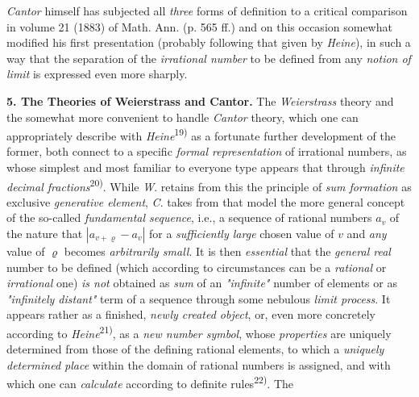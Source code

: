 \thispagestyle{fancy}

\vspace{0.5cm}

\textit{Cantor} himself has subjected all \textit{three} forms of definition to a critical comparison in volume 21 (1883) of Math. Ann. (p. 565 ff.) and on this occasion somewhat modified his first presentation (probably following that given by \textit{Heine}), in such a way that the separation of the \textit{irrational number} to be defined from any \textit{notion of limit} is expressed even more sharply.

\vspace{0.3cm}

\textbf{5. The Theories of Weierstrass and Cantor.} The \textit{Weierstrass} theory and the somewhat more convenient to handle \textit{Cantor} theory, which one can appropriately describe with \textit{Heine}\textsuperscript{19)} as a fortunate further development of the former, both connect to a specific \textit{formal representation} of irrational numbers, as whose simplest and most familiar to everyone type appears that through \textit{infinite decimal fractions}\textsuperscript{20)}. While \textit{W}. retains from this the principle of \textit{sum formation} as exclusive \textit{generative element}, \textit{C}. takes from that model the more general concept of the so-called \textit{fundamental sequence}, i.e., a sequence of rational numbers $a_v$ of the nature that $|a_{v+\varrho}-a_v|$ for a \textit{sufficiently large} chosen value of $v$ and \textit{any} value of $\varrho$ becomes \textit{arbitrarily small}. It is then \textit{essential} that the \textit{general real} number to be defined (which according to circumstances can be a \textit{rational} or \textit{irrational} one) \textit{is not} obtained as \textit{sum} of an \textit{"infinite"} number of elements or as \textit{"infinitely distant"} term of a sequence through some nebulous \textit{limit process}. It appears rather as a finished, \textit{newly created object}, or, even more concretely according to \textit{Heine}\textsuperscript{21)}, as a \textit{new number symbol}, whose \textit{properties} are uniquely determined from those of the defining rational elements, to which a \textit{uniquely determined place} within the domain of rational numbers is assigned, and with which one can \textit{calculate} according to definite rules\textsuperscript{22)}. The


